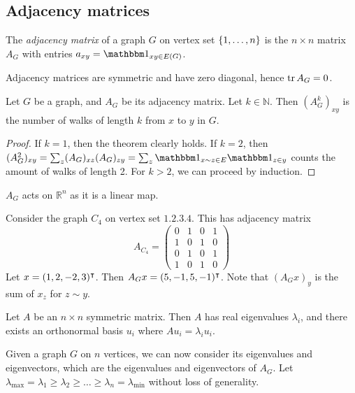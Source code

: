 \subsection{Adjacency matrices}
\begin{definition}
	The \emph{adjacency matrix} of a graph \( G \) on vertex set \( \qty{1, \dots, n} \) is the \( n \times n \) matrix \( A_G \) with entries \( a_{xy} = \mathbbm 1_{xy \in E(G)} \).
\end{definition}
\begin{remark}
	Adjacency matrices are symmetric and have zero diagonal, hence \( \tr A_G = 0 \).
\end{remark}
\begin{proposition}
	Let \( G \) be a graph, and \( A_G \) be its adjacency matrix.
	Let \( k \in \mathbb N \).
	Then \( (A_G^k)_{xy} \) is the number of walks of length \( k \) from \( x \) to \( y \) in \( G \).
\end{proposition}
\begin{proof}
	If \( k = 1 \), then the theorem clearly holds.
	If \( k = 2 \), then \( (A_G^2)_{xy} = \sum_z (A_G)_{xz} (A_G)_{zy} = \sum_z \mathbbm 1_{x \sim z \in E} \mathbbm 1_{z \in y} \) counts the amount of walks of length 2.
	For \( k > 2 \), we can proceed by induction.
\end{proof}
\( A_G \) acts on \( \mathbb R^n \) as it is a linear map.
\begin{example}
	Consider the graph \( C_4 \) on vertex set \( \qty{1, 2, 3, 4} \).
	This has adjacency matrix
	\[ A_{C_4} = \begin{pmatrix}
		0 & 1 & 0 & 1 \\
		1 & 0 & 1 & 0 \\
		0 & 1 & 0 & 1 \\
		1 & 0 & 1 & 0
	\end{pmatrix} \]
	Let \( x = (1, 2, -2, 3)^\intercal \).
	Then \( A_G x = (5, -1, 5, -1)^\intercal \).
	Note that \( (A_G x)_y \) is the sum of \( x_z \) for \( z \sim y \).
\end{example}
\begin{proposition}
	Let \( A \) be an \( n \times n \) symmetric matrix.
	Then \( A \) has real eigenvalues \( \lambda_i \), and there exists an orthonormal basis \( u_i \) where \( A u_i = \lambda_i u_i \).
\end{proposition}
Given a graph \( G \) on \( n \) vertices, we can now consider its eigenvalues and eigenvectors, which are the eigenvalues and eigenvectors of \( A_G \).
Let \( \lambda_{\mathrm{max}} = \lambda_1 \geq \lambda_2 \geq \dots \geq \lambda_n = \lambda_{\mathrm{min}} \) without loss of generality.
